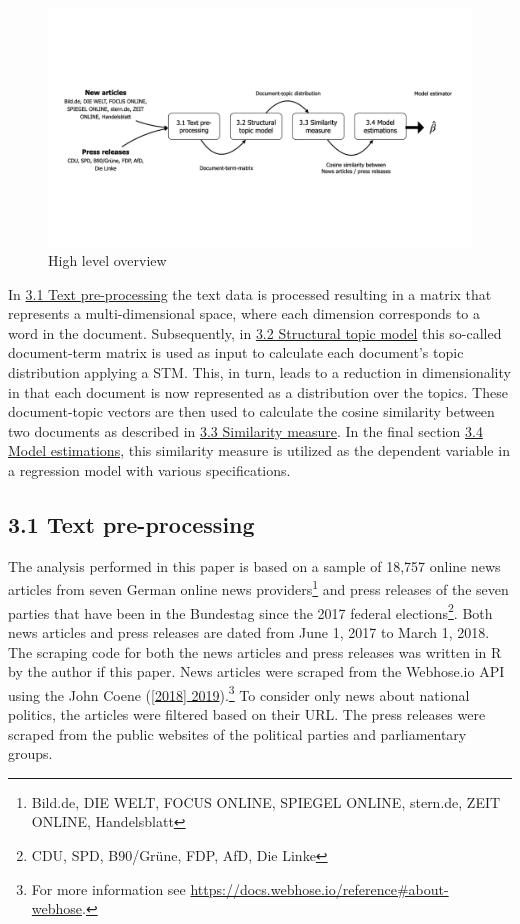 \documentclass[
  12pt,
]{article}
\begin{document}
\begin{figure}
\centering
\includegraphics{../figs/high_level_overview.png}
\caption{High level overview}
\end{figure}

In \protect\hyperlink{text-pre-processing}{3.1 Text pre-processing} the
text data is processed resulting in a matrix that represents a
multi-dimensional space, where each dimension corresponds to a word in
the document. Subsequently, in
\protect\hyperlink{structural-topic-model}{3.2 Structural topic model}
this so-called document-term matrix is used as input to calculate each
document's topic distribution applying a STM. This, in turn, leads to a
reduction in dimensionality in that each document is now represented as
a distribution over the topics. These document-topic vectors are then
used to calculate the cosine similarity between two documents as
described in \protect\hyperlink{similarity-measure}{3.3 Similarity
measure}. In the final section
\protect\hyperlink{34-model-estimations}{3.4 Model estimations}, this
similarity measure is utilized as the dependent variable in a regression
model with various specifications.

\hypertarget{text-pre-processing}{%
\subsection{3.1 Text pre-processing}\label{text-pre-processing}}

The analysis performed in this paper is based on a sample of 18,757
online news articles from seven German online news providers\footnote{Bild.de,
  DIE WELT, FOCUS ONLINE, SPIEGEL ONLINE, stern.de, ZEIT ONLINE,
  Handelsblatt} and press releases of the seven parties that have been
in the Bundestag since the 2017 federal elections\footnote{CDU, SPD,
  B90/Grüne, FDP, AfD, Die Linke}. Both news articles and press releases
are dated from June 1, 2017 to March 1, 2018. The scraping code for both
the news articles and press releases was written in R by the author if
this paper. News articles were scraped from the Webhose.io API using the
John Coene (\protect\hyperlink{ref-johncoene_webhoser_2019}{{[}2018{]}
2019}).\footnote{For more information see
  \url{https://docs.webhose.io/reference\#about-webhose}.} To consider
only news about national politics, the articles were filtered based on
their URL. The press releases were scraped from the public websites of
the political parties and parliamentary groups.
\end{document}
